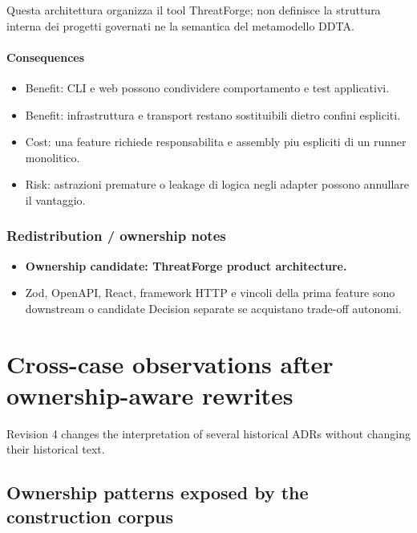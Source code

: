 \documentclass[
  10pt,
]{article}
\providecommand{\tightlist}{%
  \setlength{\itemsep}{0pt}\setlength{\parskip}{0pt}}
\begin{document}
Questa architettura organizza il tool ThreatForge; non definisce la
struttura interna dei progetti governati ne la semantica del metamodello
DDTA.

\paragraph{Consequences}\label{consequences-31}

\begin{itemize}
\tightlist
\item
  Benefit: CLI e web possono condividere comportamento e test
  applicativi.
\item
  Benefit: infrastruttura e transport restano sostituibili dietro
  confini espliciti.
\item
  Cost: una feature richiede responsabilita e assembly piu espliciti di
  un runner monolitico.
\item
  Risk: astrazioni premature o leakage di logica negli adapter possono
  annullare il vantaggio.
\end{itemize}

\subsubsection{Redistribution / ownership
notes}\label{redistribution-ownership-notes-15}

\begin{itemize}
\tightlist
\item
  \textbf{Ownership candidate: ThreatForge product architecture.}
\item
  Zod, OpenAPI, React, framework HTTP e vincoli della prima feature sono
  downstream o candidate Decision separate se acquistano trade-off
  autonomi.
\end{itemize}

\newpage

\section{Cross-case observations after ownership-aware
rewrites}\label{cross-case-observations-after-ownership-aware-rewrites}

Revision 4 changes the interpretation of several historical ADRs without
changing their historical text.

\subsection{Ownership patterns exposed by the construction
corpus}\label{ownership-patterns-exposed-by-the-construction-corpus}
\end{document}
